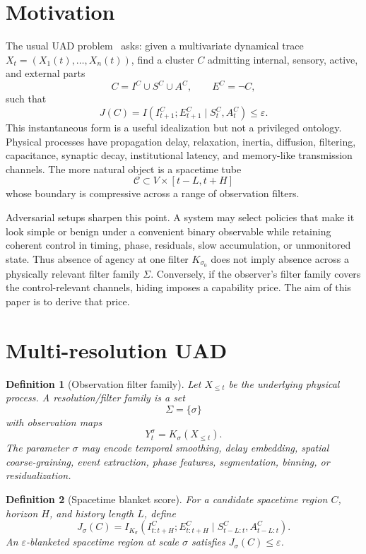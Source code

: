 \documentclass[10pt]{article}
\newtheorem{definition}{Definition}
\newcommand{\MI}{I}
\begin{document}
\section{Motivation}

The usual UAD problem~\cite{uad2025} asks: given a multivariate dynamical trace \(X_t=(X_1(t),\ldots,X_n(t))\), find a cluster \(C\) admitting internal, sensory, active, and external parts
\[
C=I^C\cup S^C\cup A^C,\qquad E^C=\neg C,
\]
such that
\begin{equation}
J(C)
=
\MI(I^C_{t+1};E^C_{t+1}\mid S^C_t,A^C_t)
\le \varepsilon.
\label{eq:instant_uad}
\end{equation}
This instantaneous form is a useful idealization but not a privileged ontology. Physical processes have propagation delay, relaxation, inertia, diffusion, filtering, capacitance, synaptic decay, institutional latency, and memory-like transmission channels. The more natural object is a spacetime tube
\[
\mathcal C\subset V\times[t-L,t+H]
\]
whose boundary is compressive across a range of observation filters.

Adversarial setups sharpen this point. A system may select policies that make it look simple or benign under a convenient binary observable while retaining coherent control in timing, phase, residuals, slow accumulation, or unmonitored state. Thus absence of agency at one filter \(K_{\sigma_0}\) does not imply absence across a physically relevant filter family \(\Sigma\). Conversely, if the observer's filter family covers the control-relevant channels, hiding imposes a capability price. The aim of this paper is to derive that price.

\section{Multi-resolution UAD}

\begin{definition}[Observation filter family]
Let \(X_{\le t}\) be the underlying physical process. A resolution/filter family is a set
\[
\Sigma=\{\sigma\}
\]
with observation maps
\[
Y^\sigma_t=K_\sigma(X_{\le t}).
\]
The parameter \(\sigma\) may encode temporal smoothing, delay embedding, spatial coarse-graining, event extraction, phase features, segmentation, binning, or residualization.
\end{definition}

\begin{definition}[Spacetime blanket score]
For a candidate spacetime region \(C\), horizon \(H\), and history length \(L\), define
\begin{equation}
J_\sigma(C)
=
\MI_{K_\sigma}
\left(
I^C_{t:t+H};
E^C_{t:t+H}
\mid
S^C_{t-L:t},A^C_{t-L:t}
\right).
\label{eq:spacetime_score}
\end{equation}
An \(\varepsilon\)-blanketed spacetime region at scale \(\sigma\) satisfies \(J_\sigma(C)\le \varepsilon\).
\end{definition}
\end{document}
